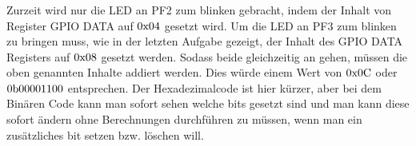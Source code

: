 \subsubsection{}
Zurzeit wird nur die LED an PF2 zum blinken gebracht, indem der Inhalt von Register GPIO DATA auf $0\text x 04$ gesetzt wird. Um die LED an PF3 zum blinken zu bringen muss, wie in der letzten Aufgabe gezeigt, der Inhalt des GPIO DATA Registers auf $0\text x 08$ gesetzt werden. Sodass beide gleichzeitig an gehen, müssen die oben genannten Inhalte addiert werden. Dies würde einem Wert von $0\text x 0\text C$ oder $0\text b 00001100$ entsprechen. Der Hexadezimalcode ist hier kürzer, aber bei dem Binären Code kann man sofort sehen welche bits gesetzt sind und man kann diese sofort ändern ohne Berechnungen durchführen zu müssen, wenn man ein zusätzliches bit setzen bzw. löschen will.
